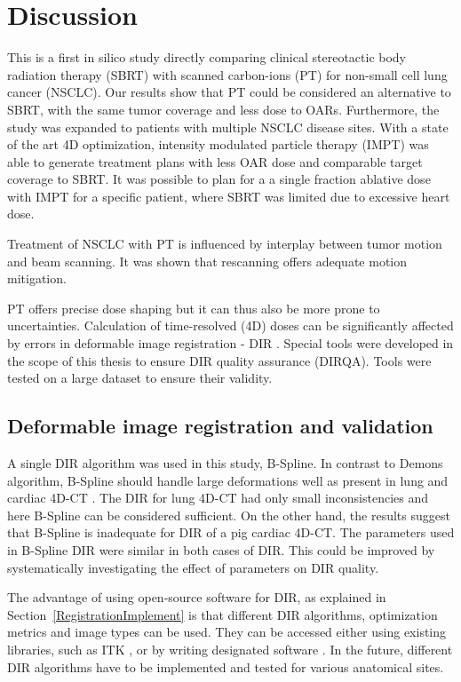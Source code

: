 \documentclass[type=dr, dr=rernat, accentcolor=tud7b,colorbacktitle, bigchapter, openright, twoside, 12pt ]{tudthesis}
\begin{document}
\chapter{Discussion}

This is a first in silico study directly comparing clinical stereotactic body radiation therapy (SBRT) with scanned carbon-ions (PT) for non-small cell lung cancer (NSCLC). 
Our results show that PT could be considered an alternative to SBRT, with the same tumor coverage and less dose to OARs. Furthermore, the study was expanded to patients with multiple
NSCLC disease sites. With a state of the art 4D optimization, intensity modulated particle therapy (IMPT) was able to generate treatment plans with less OAR dose and comparable target coverage
to SBRT. It was possible to plan for a a single fraction ablative dose with IMPT for a specific patient, where SBRT was limited due to excessive heart dose.

Treatment of NSCLC with PT is influenced by interplay between tumor motion and beam scanning. It was shown that rescanning offers
adequate motion mitigation. 

PT offers precise dose shaping but it can thus also be more prone to uncertainties. Calculation of time-resolved (4D) doses can be significantly
affected by errors in deformable image registration - DIR \cite{Heath2006}. Special tools were developed in the scope of this thesis to ensure DIR quality assurance (DIRQA).
Tools were tested on a large dataset to ensure their validity.


\section{Deformable image registration and validation}

A single DIR algorithm was used in this study, B-Spline. In contrast to Demons algorithm, B-Spline should handle large deformations well as present in lung and cardiac 4D-CT \cite{Tang2013}.
The DIR for lung 4D-CT had only small inconsistencies and here B-Spline can be considered sufficient. On the other hand, the results suggest that B-Spline is inadequate for
DIR of a pig cardiac 4D-CT. The parameters used
in B-Spline DIR were similar in both cases of DIR. This could be improved by systematically investigating the effect of parameters on DIR quality. 

The advantage of using open-source software for DIR, as explained in Section~\ref{RegistrationImplement} is that different DIR algorithms, 
optimization metrics and image types can be used. They can be accessed either using
existing libraries, such as ITK \cite{Yoo2002}, or by writing designated software \cite{Fedorov2015}. In the future, different DIR algorithms have to be implemented 
and tested for various anatomical sites.
\end{document}
